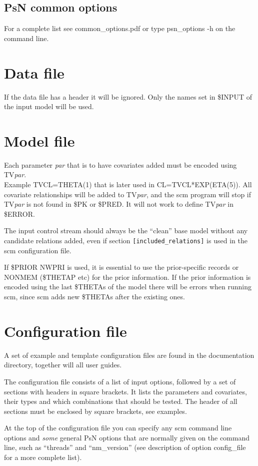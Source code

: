 \subsection{PsN common options}
For a complete list see common\_options.pdf or type psn\_options -h on the command line.

\section{Data file}
If the data file has a header it will be ignored. Only the names set in \$INPUT of the input model will be used.

\section{Model file}
Each parameter \emph{par} that is to have covariates added must be encoded using TV\emph{par}.\\
Example TVCL=THETA(1) that is later used in CL=TVCL*EXP(ETA(5)). All covariate relationships will be added to TV\emph{par}, and the scm program will stop if TV\emph{par} is not found in \$PK or \$PRED. It will not work to define TV\emph{par} in \$ERROR.

The input control stream should always be the ``clean'' base model without any candidate relations added, even if section 
\verb|[included_relations]| is used in the scm configuration file. 

If \$PRIOR NWPRI is used, it is essential to use the prior-specific records or NONMEM (\$THETAP etc) for the prior information. If the prior information is encoded using the last \$THETAs of the model there will be errors when running scm, since scm adds new \$THETAs after the existing ones. 

\section{Configuration file}
A set of example and template configuration files are found in the documentation directory, together will all user guides.

The configuration file consists of a list of input options, followed by a set of sections with headers in square brackets. It lists the parameters and covariates, their types and which combinations that should be tested. The header of all sections must be enclosed by square brackets, see examples. 

At the top of the configuration file you can specify any scm command line options and \emph{some} general PsN options that are normally given on the command line, such as “threads” and “nm\_version” (see description of option config\_file for a more complete list). 

